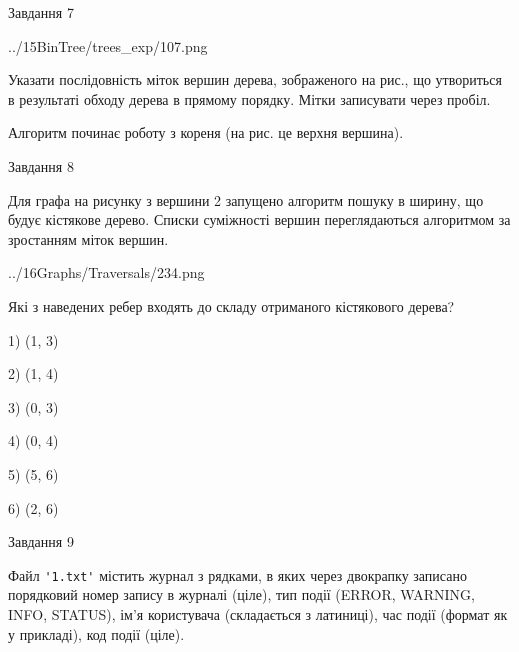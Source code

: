 \documentclass[12pt, ukrainian]{article}
\def\code#1{\Verb!#1!}
\begin{document}
{\vspace{10mm}\par

\newpage
\begin{minipage}[t]{9.7cm}
               
{\begin{center}Завдання {7}\end{center}}
\vspace{-4mm}

\begin{center}
	{../15BinTree/trees_exp/107.png}
\end{center}
Указати послідовність міток вершин дерева, зображеного на рис., що утвориться в результаті обходу дерева в прямому порядку. Мітки записувати через пробіл.\par Алгоритм починає роботу з кореня (на рис. це верхня вершина).\par

\end{minipage}
\vline \hspace{8mm}
\begin{minipage}[t]{8.0cm}
               
{\begin{center}Завдання {8}\end{center}}
\vspace{-4mm}
Для графа на рисунку з вершини 2 запущено алгоритм пошуку в ширину, що будує кістякове дерево. Списки суміжності вершин переглядаються алгоритмом за зростанням міток вершин.\par
\begin{center}
	{../16Graphs/Traversals/234.png}
\end{center}
\par Які з наведених ребер входять до складу отриманого кістякового дерева?\par
1) (1, 3)\par
2) (1, 4)\par
3) (0, 3)\par
4) (0, 4)\par
5) (5, 6)\par
6) (2, 6)\par
{\vskip 15pt} \par

\end{minipage}

               
{\begin{center}Завдання {9}\end{center}}
\vspace{-4mm}
Файл \code{'1.txt'} містить журнал з рядками, в яких через двокрапку записано поряд\-ко\-вий номер запису в журналі (ціле), тип події (ERROR, WARNING, INFO, STATUS), ім'я користувача (складається з латиниці), час події (фор\-мат як у прикладі), код події (ціле).

}
\end{document}
